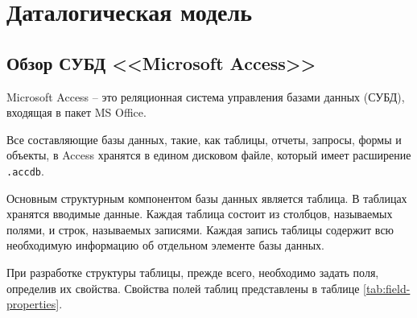 \section{Даталогическая модель}\label{sec:datalogical-model}

\subsection{Обзор СУБД <<Microsoft Access>>}

Microsoft Access -- это реляционная система управления базами данных (СУБД), входящая в пакет MS Office.

Все составляющие базы данных, такие, как таблицы, отчеты, запросы, формы и объекты, в Access хранятся в едином дисковом файле, который имеет расширение \texttt{.accdb}.

Основным структурным компонентом базы данных является таблица. В таблицах хранятся вводимые данные. Каждая таблица состоит из столбцов, называемых полями, и строк, называемых записями. Каждая запись таблицы содержит всю необходимую информацию об отдельном элементе базы данных.

При разработке структуры таблицы, прежде всего, необходимо задать поля, определив их свойства. Свойства полей таблиц представлены в таблице \ref{tab:field-properties}.

